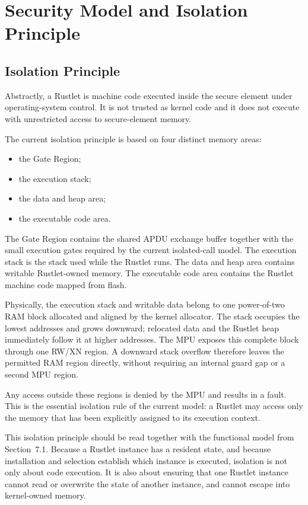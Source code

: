 \section{Security Model and Isolation Principle}

\subsection{Isolation Principle}

Abstractly, a Rustlet is machine code executed inside the secure element
under operating-system control. It is not trusted as kernel code and it
does not execute with unrestricted access to secure-element memory.

The current isolation principle is based on four distinct memory areas:
\begin{itemize}
\item the Gate Region;
\item the execution stack;
\item the data and heap area;
\item the executable code area.
\end{itemize}

The Gate Region contains the shared APDU exchange buffer together with
the small execution gates required by the current isolated-call model.
The execution stack is the stack used while the Rustlet runs. The data
and heap area contains writable Rustlet-owned memory. The executable
code area contains the Rustlet machine code mapped from flash.

Physically, the execution stack and writable data belong to one
power-of-two RAM block allocated and aligned by the kernel allocator.
The stack occupies the lowest addresses and grows downward; relocated
data and the Rustlet heap immediately follow it at higher addresses.
The MPU exposes this complete block through one RW/XN region. A downward
stack overflow therefore leaves the permitted RAM region directly, without
requiring an internal guard gap or a second MPU region.

Any access outside these regions is denied by the MPU and results in a
fault. This is the essential isolation rule of the current model: a
Rustlet may access only the memory that has been explicitly assigned to
its execution context.

This isolation principle should be read together with the functional
model from Section~7.1. Because a Rustlet instance has a resident state,
and because installation and selection establish which instance is
executed, isolation is not only about code execution. It is also about
ensuring that one Rustlet instance cannot read or overwrite the state of
another instance, and cannot escape into kernel-owned memory.

